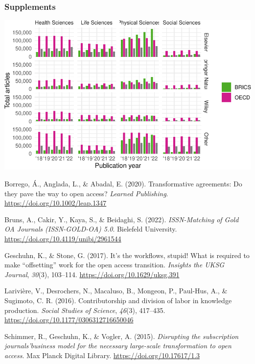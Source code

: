 \documentclass[a4paper,man,floatsintext,longtable,noextraspace,12pt]{apa6}
\newenvironment{CSLReferences}%
  {}%
  {\par}
\begin{document}
\hypertarget{supplements}{%
\subsubsection{Supplements}\label{supplements}}

\begin{center}\includegraphics[width=0.99\linewidth]{fig/unnamed-chunk-10-1} \end{center}

\hypertarget{refs}{}
\begin{CSLReferences}{1}{0}
\leavevmode{}%
Borrego, Á., Anglada, L., \& Abadal, E. (2020). Transformative
agreements: Do they pave the way to open access? \emph{Learned
Publishing}. \url{https://doi.org/10.1002/leap.1347}

\leavevmode{}%
Bruns, A., Cakir, Y., Kaya, S., \& Beidaghi, S. (2022).
\emph{{ISSN-Matching of Gold OA Journals (ISSN-GOLD-OA) 5.0}}. Bielefeld
University. \url{https://doi.org/10.4119/unibi/2961544}

\leavevmode{}%
Geschuhn, K., \& Stone, G. (2017). It's the workflows, stupid! What is
required to make {``offsetting''} work for the open access transition.
\emph{Insights the {UKSG} Journal}, \emph{30}(3), 103--114.
\url{https://doi.org/10.1629/uksg.391}

\leavevmode{}%
Larivière, V., Desrochers, N., Macaluso, B., Mongeon, P., Paul-Hus, A.,
\& Sugimoto, C. R. (2016). Contributorship and division of labor in
knowledge production. \emph{Social Studies of Science}, \emph{46}(3),
417--435. \url{https://doi.org/10.1177/0306312716650046}

\leavevmode{}%
Schimmer, R., Geschuhn, K., \& Vogler, A. (2015). \emph{{Disrupting the
subscription journals'business model for the necessary large-scale
transformation to open access}}. Max Planck Digital Library.
\url{https://doi.org/10.17617/1.3}

\end{CSLReferences}
\end{document}
